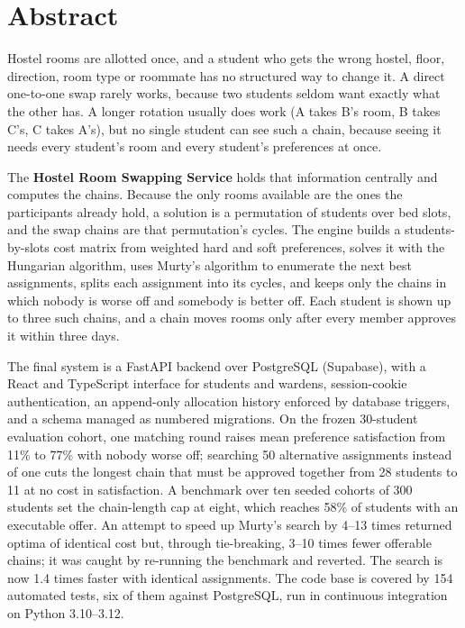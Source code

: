 
\chapter*{Abstract}

Hostel rooms are allotted once, and a student who gets the wrong hostel,
floor, direction, room type or roommate has no structured way to change
it. A direct one-to-one swap rarely works, because two students seldom
want exactly what the other has. A longer rotation usually does work
(A takes B's room, B takes C's, C takes A's), but no single student can
see such a chain, because seeing it needs every student's room and every
student's preferences at once.

The \textbf{Hostel Room Swapping Service} holds that information
centrally and computes the chains. Because the only rooms available are
the ones the participants already hold, a solution is a permutation of
students over bed slots, and the swap chains are that permutation's
cycles. The engine builds a students-by-slots cost matrix from weighted
hard and soft preferences, solves it with the Hungarian algorithm, uses
Murty's algorithm to enumerate the next best assignments, splits each
assignment into its cycles, and keeps only the chains in which nobody is
worse off and somebody is better off. Each student is shown up to three
such chains, and a chain moves rooms only after every member approves it
within three days.

The final system is a FastAPI backend over PostgreSQL (Supabase), with a
React and TypeScript interface for students and wardens, session-cookie
authentication, an append-only allocation history enforced by database
triggers, and a schema managed as numbered migrations. On the frozen
30-student evaluation cohort, one matching round raises mean preference
satisfaction from 11\% to 77\% with nobody worse off; searching 50
alternative assignments instead of one cuts the longest chain that must
be approved together from 28 students to 11 at no cost in satisfaction.
A benchmark over ten seeded cohorts of 300 students set the chain-length
cap at eight, which reaches 58\% of students with an executable offer.
An attempt to speed up Murty's search by 4--13 times returned optima
of identical cost but, through tie-breaking, 3--10 times fewer
offerable chains; it was caught by re-running the benchmark and
reverted. The search is now 1.4 times faster with identical
assignments. The code base
is covered by 154 automated tests, six of them against PostgreSQL, run
in continuous integration on
Python 3.10--3.12.

